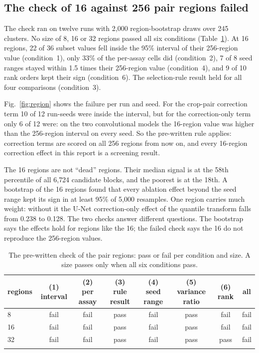 \documentclass[pdflatex,sn-mathphys-num]{sn-jnl}
\newcommand{\lit}[1]{#1}
\newcommand{\cl}[1]{#1}
\newcommand{\TabCheck}{8 & fail & fail & pass & fail & pass & fail & fail \\
16 & fail & fail & pass & fail & pass & fail & fail \\
32 & fail & fail & pass & fail & pass & pass & fail \\}
\newcommand{\condFourN}{8}
\newcommand{\condFourP}{7}
\newcommand{\condOneN}{36}
\newcommand{\condOneP}{22}
\newcommand{\condSixN}{10}
\newcommand{\condSixP}{9}
\newcommand{\condTwoShare}{33}
\newcommand{\inCoN}{12}
\newcommand{\inCoP}{6}
\newcommand{\inCorN}{12}
\newcommand{\inCorP}{10}
\newcommand{\nBoot}{2{,}000}
\newcommand{\nCandBlocks}{6{,}724}
\newcommand{\nClusters}{245}
\newcommand{\nResample}{5{,}000}
\newcommand{\pairLowPct}{18}
\newcommand{\pairPct}{58}
\newcommand{\regNinetySix}{0.238}
\newcommand{\regNinetySixTo}{0.128}
\begin{document}
\subsection{The check of \lit{16} against \lit{256} pair regions failed}

\cl{The check ran on twelve runs with \nBoot{} region-bootstrap draws over \nClusters{} clusters. No size of \lit{8}, \lit{16} or \lit{32} regions passed all six conditions (Table~\ref{tab:check}). At \lit{16} regions, \condOneP{} of \condOneN{} subset values fell inside the \lit{95}\% interval of their \lit{256}-region value (condition~\lit{1}), only \condTwoShare{}\% of the per-assay cells did (condition~\lit{2}), \condFourP{} of \condFourN{} seed ranges stayed within \lit{1.5} times their \lit{256}-region value (condition~\lit{4}), and \condSixP{} of \condSixN{} rank orders kept their sign (condition~\lit{6}). The selection-rule result held for all four comparisons (condition~\lit{3}).}

\cl{Fig.~\ref{fig:region} shows the failure per run and seed. For the crop-pair correction term \inCorP{} of \inCorN{} run-seeds were inside the interval, but for the correction-only term only \inCoP{} of \inCoN{} were: on the two convolutional models the \lit{16}-region value was higher than the \lit{256}-region interval on every seed. So the pre-written rule applies: correction terms are scored on all \lit{256} regions from now on, and every \lit{16}-region correction effect in this report is a screening result.}

\cl{The \lit{16} regions are not ``dead'' regions. Their median signal is at the \pairPct{}th percentile of all \nCandBlocks{} candidate blocks, and the poorest is at the \pairLowPct{}th. A bootstrap of the \lit{16} regions found that every ablation effect beyond the seed range kept its sign in at least \lit{95}\% of \nResample{} resamples. One region carries much weight: without it the U-Net correction-only effect of the quantile transform falls from \regNinetySix{} to \regNinetySixTo{}. The two checks answer different questions. The bootstrap says the effects hold for regions like the \lit{16}; the failed check says the \lit{16} do not reproduce the \lit{256}-region values.}

\begin{table}[!htbp]
\caption{\cl{The pre-written check of the pair regions: pass or fail per condition and size. A size passes only when all six conditions pass.}}\label{tab:check}
\footnotesize
\setlength{\tabcolsep}{3pt}
\begin{tabular}{lccccccc}
\toprule
regions & (\lit{1}) interval & (\lit{2}) per assay & (\lit{3}) rule result & (\lit{4}) seed range & (\lit{5}) variance ratio & (\lit{6}) rank & all \\
\midrule
\TabCheck
\botrule
\end{tabular}
\end{table}
\end{document}

